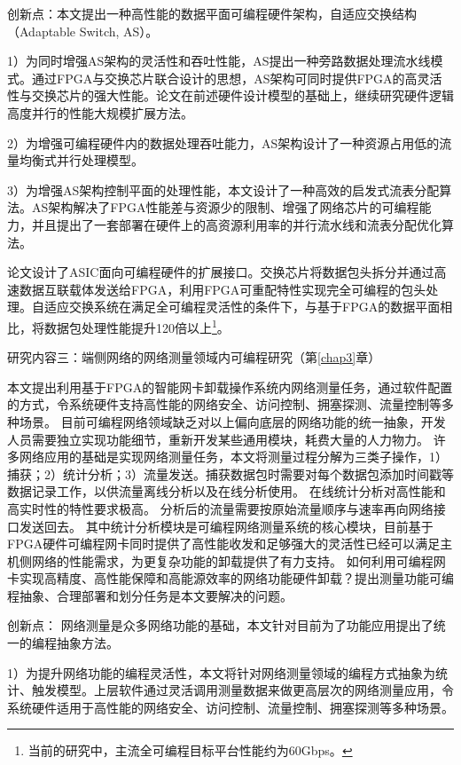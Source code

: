 {\hei 创新点：}本文提出一种高性能的数据平面可编程硬件架构，自适应交换结构（Adaptable Switch, AS）。

1）为同时增强AS架构的灵活性和吞吐性能，AS提出一种旁路数据处理流水线模式。通过FPGA与交换芯片联合设计的思想，AS架构可同时提供FPGA的高灵活性与交换芯片的强大性能。论文在前述硬件设计模型的基础上，继续研究硬件逻辑高度并行的性能大规模扩展方法。

2）为增强可编程硬件内的数据处理吞吐能力，AS架构设计了一种资源占用低的流量均衡式并行处理模型。

3）为增强AS架构控制平面的处理性能，本文设计了一种高效的启发式流表分配算法。AS架构解决了FPGA性能差与资源少的限制、增强了网络芯片的可编程能力，并且提出了一套部署在硬件上的高资源利用率的并行流水线和流表分配优化算法。

论文设计了ASIC面向可编程硬件的扩展接口。交换芯片将数据包头拆分并通过高速数据互联载体发送给FPGA，利用FPGA可重配特性实现完全可编程的包头处理。自适应交换系统在满足全可编程灵活性的条件下，与基于FPGA的数据平面相比，将数据包处理性能提升120倍以上\footnote{当前的研究中，主流全可编程目标平台性能约为60Gbps。}。

{\hei 研究内容三：端侧网络的网络测量领域内可编程研究（第\ref{chap3}章）}

{\hei 本文提出利用基于FPGA的智能网卡卸载操作系统内网络测量任务，通过软件配置的方式，令系统硬件支持高性能的网络安全、访问控制、拥塞探测、流量控制等多种场景。}
目前可编程网络领域缺乏对以上偏向底层的网络功能的统一抽象，开发人员需要独立实现功能细节，重新开发某些通用模块，耗费大量的人力物力。
许多网络应用的基础是实现网络测量任务，本文将测量过程分解为三类子操作，1）捕获；2）统计分析；3）流量发送。捕获数据包时需要对每个数据包添加时间戳等数据记录工作，以供流量离线分析以及在线分析使用。
在线统计分析对高性能和高实时性的特性要求极高。
分析后的流量需要按原始流量顺序与速率再向网络接口发送回去。
其中统计分析模块是可编程网络测量系统的核心模块，目前基于FPGA硬件可编程网卡同时提供了高性能收发和足够强大的灵活性已经可以满足主机侧网络的性能需求，为更复杂功能的卸载提供了有力支持。
如何利用可编程网卡实现高精度、高性能保障和高能源效率的网络功能硬件卸载？提出测量功能可编程抽象、合理部署和划分任务是本文要解决的问题。

{\hei 创新点：}
网络测量是众多网络功能的基础，本文针对目前为了功能应用提出了统一的编程抽象方法。

1）为提升网络功能的编程灵活性，本文将针对网络测量领域的编程方式抽象为统计、触发模型。上层软件通过灵活调用测量数据来做更高层次的网络测量应用，令系统硬件适用于高性能的网络安全、访问控制、流量控制、拥塞探测等多种场景。


